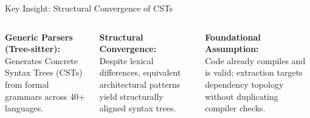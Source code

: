 \documentclass[aspectratio=169,10pt]{beamer}
\begin{document}
\begin{frame}{Key Insight: Structural Convergence of CSTs}
  \par\vspace{0.4em}
  
  \begin{columns}[c,onlytextwidth]
      \textbf{Generic Parsers (Tree-sitter):}\\
      {\small Generates Concrete Syntax Trees (CSTs) from formal grammars across 40+ languages.}
      
      \vspace{0.5em}
      \textbf{Structural Convergence:}\\
      {\small Despite lexical differences, equivalent architectural patterns yield structurally aligned syntax trees.}
          
      \vspace{0.5em}
      \textbf{Foundational Assumption:}\\
      {\small Code already compiles and is valid; extraction targets dependency topology without duplicating compiler checks.}


\end{columns}
\end{frame}
\end{document}
